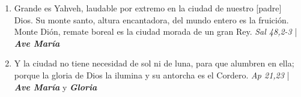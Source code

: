 \documentclass[../../devocionario.tex]{subfiles}
\begin{document}
\begin{enumerate}
        \item Grande es Yahveh, laudable por extremo en la ciudad de nuestro [padre] Dios. Su monte santo, altura encantadora, 
            del mundo entero  es la fruición. Monte Dión, remate boreal es la ciudad morada de un gran Rey. \textit{Sal 48,2-3} | \textbf{\textit{Ave María}}

        \item Y la ciudad no tiene necesidad de sol ni de luna, para que alumbren en ella; 
            porque la gloria de Dios la ilumina y su antorcha es el Cordero. \textit{Ap 21,23} | \textbf{\textit{Ave María}} y \textbf{\textit{Gloria}}
    
    \end{enumerate}
\end{document}

